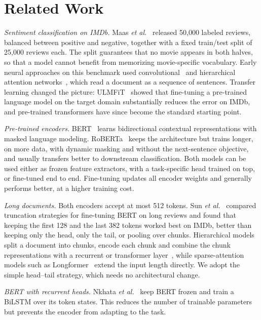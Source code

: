 \documentclass[conference]{IEEEtran}
\begin{document}
\section{Related Work}
\textit{Sentiment classification on IMDb.} Maas \textit{et al.}~\cite{maas2011} released 50{,}000 labeled reviews, balanced between positive and negative, together with a fixed train/test split of 25{,}000 reviews each. The split guarantees that no movie appears in both halves, so that a model cannot benefit from memorizing movie-specific vocabulary. Early neural approaches on this benchmark used convolutional~\cite{kim2014} and hierarchical attention networks~\cite{yang2016han}, which read a document as a sequence of sentences. Transfer learning changed the picture: ULMFiT~\cite{howard2018} showed that fine-tuning a pre-trained language model on the target domain substantially reduces the error on IMDb, and pre-trained transformers have since become the standard starting point.

\textit{Pre-trained encoders.} BERT~\cite{devlin2019} learns bidirectional contextual representations with masked language modeling. RoBERTa~\cite{liu2019roberta} keeps the architecture but trains longer, on more data, with dynamic masking and without the next-sentence objective, and usually transfers better to downstream classification. Both models can be used either as frozen feature extractors, with a task-specific head trained on top, or fine-tuned end to end. Fine-tuning updates all encoder weights and generally performs better, at a higher training cost.

\textit{Long documents.} Both encoders accept at most 512 tokens. Sun \textit{et al.}~\cite{sun2019} compared truncation strategies for fine-tuning BERT on long reviews and found that keeping the first 128 and the last 382 tokens worked best on IMDb, better than keeping only the head, only the tail, or pooling over chunks. Hierarchical models split a document into chunks, encode each chunk and combine the chunk representations with a recurrent or transformer layer~\cite{pappagari2019}, while sparse-attention models such as Longformer~\cite{beltagy2020} extend the input length directly. We adopt the simple head--tail strategy, which needs no architectural change.

\textit{BERT with recurrent heads.} Nkhata \textit{et al.}~\cite{nkhata2023} keep BERT frozen and train a BiLSTM over its token states. This reduces the number of trainable parameters but prevents the encoder from adapting to the task.
\end{document}
